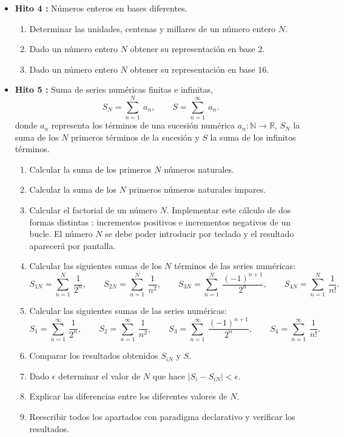 \documentclass[12pt,spanish]{article}
\begin{document}
\begin{itemize}
\vspace{1cm}
\item {\bf Hito 4 :}  
Números enteros en bases diferentes. 
\begin{enumerate} 
\item Determinar las unidades, centenas y millares de un número entero $ N $. 
\item Dado un número entero $ N $ obtener su representación en base 2. 
\item Dado un número entero $ N $ obtener su representación en base 16. 
\end{enumerate}
 
 
\newpage 
\item {\bf Hito 5 :}   Suma de series numéricas finitas e infinitas,    
$$
   S_N = \sum_{n=1} ^{N} \ a_n, \qquad 
   S =  \sum_{n=1} ^{\infty} \ a_n.
$$ 
donde $ a_n $ representa  los términos de una sucesión numérica $ a_n: \mathbb{N} \rightarrow\mathbb{R}$,
$ S_N $ la suma de los $ N $ primeros términos de la sucesión y $ S $ la suma de los infinitos términos. 
                                                                         
\begin{enumerate}    
	\item Calcular la suma de los primeros $ N $  números naturales.	
	\item Calcular la suma de los $ N $  primeros números naturales impares.
	
	\item Calcular el factorial de un número $ N $. 
	Implementar este cálculo de dos
	formas distintas : incrementos positivos e incrementos negativos
	 de un  bucle. 
    El número $ N $ se debe poder introducir por teclado y el resultado aparecerá
	por pantalla. 
	\item Calcular 
	 las siguientes sumas de los $ N $ términos de las series  numéricas: 	
	$$
	S_{1N} = \sum _{n=1} ^{N}  \  \frac{ 1 }{  2^n  }, \qquad 
	S_{2N} = \sum _{n=1} ^{N}  \  \frac{ 1 }{  n^2  }, \qquad  
	S_{3N} = \sum _{n=1} ^{N}  \  \frac{  (-1)^{n+1} }{  2^n  }, \qquad
	S_{4N} =\sum _{n=1} ^{N} \ \frac{ 1 } { n ! }. \qquad  
	$$
	\item Calcular 
		 las siguientes sumas de las series numéricas: 	
		$$
		S_{1} = \sum _{n=1} ^{\infty}  \  \frac{ 1 }{  2^n  }, \qquad 
		S_{2} = \sum _{n=1} ^{\infty}  \  \frac{ 1 }{  n^2  }, \qquad  
		S_{3} = \sum _{n=1} ^{\infty}  \  \frac{  (-1)^{n+1} }{  2^n  }, \qquad
		S_{4} =\sum _{n=1} ^{\infty} \ \frac{ 1 } { n ! }. \qquad  
		$$
	\item Comparar los resultados obtenidos $ S_{iN} $ y $ S $. 
	\item Dado $ \epsilon $ determinar el valor de $ N $ que hace $ | S_i - S_{iN} | < \epsilon $. 
	\item Explicar las diferencias entre los diferentes valores de $ N $.
	\item Reescribir todos los apartados con paradigma declarativo y verificar los resultados. 
	

\end{enumerate}
\end{itemize}
\end{document}
